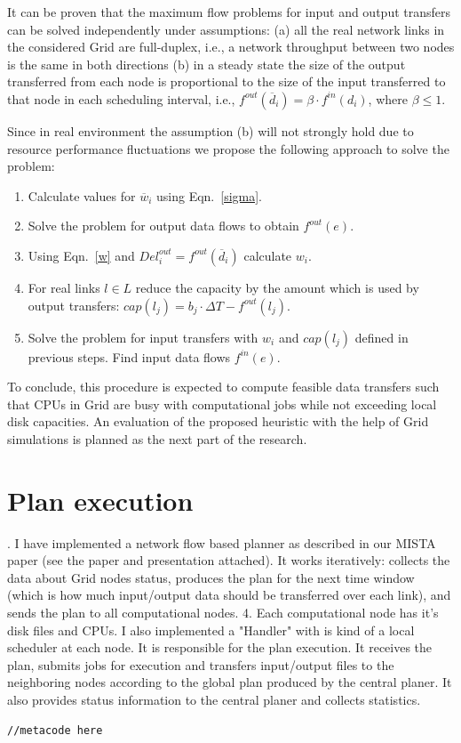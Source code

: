 \documentclass{svjour3}                     %
\begin{document}
It can be proven that the maximum flow problems for input and output transfers
can be solved independently under assumptions: (a) all the real network links
in the considered Grid are full-duplex, i.e., a network throughput between two
nodes is the same in both directions (b) in a steady state the size of the
output transferred from each node is proportional to the size of the input
transferred to that node in each scheduling interval, i.e.,
$f^{out}(\overline{d}_{i})= \beta \cdot f^{in}(d_{i})$, where $\beta \leq 1$.

Since in real environment the assumption (b) will not strongly hold due to
resource performance fluctuations we propose the following approach to
solve the problem:
%
\begin{enumerate}
\item Calculate values for $\overline{w}_{i}$ using Eqn.~\ref{sigma}.
\item Solve the problem for output data flows to obtain $f^{out}(e)$.
\item Using Eqn.~\ref{w} and $Del_{i}^{out} = f^{out}(\overline{d}_{i})$ calculate $w_{i}$.
\item For real links $l \in L$ reduce the capacity by the amount which is used by output transfers: $cap(l_{j}) = b_{j} \cdot \Delta T - f^{out}(l_{j})$.
\item Solve the problem for input transfers with $w_{i}$ and $cap(l_{j})$ defined in previous steps. Find input data flows $f^{in}(e)$.
\end{enumerate}
%
To conclude, this procedure is expected to compute feasible data transfers 
such that CPUs in Grid are busy with computational jobs while not exceeding 
local disk capacities. An evaluation of the proposed heuristic with the help of Grid simulations is planned as the next part of the research. 

\section{Plan execution}
\label{plan-execution}
. I have implemented a network flow based planner as described in our MISTA paper (see the paper and presentation attached). It works iteratively: collects the data about Grid nodes status, produces the plan for the next time window (which is how much input/output data should be transferred over each link), and sends the plan to all computational nodes.
4. Each computational node has it's disk files and CPUs. I also implemented a "Handler" with is kind of a local scheduler at each node. It is responsible for the plan execution. It receives the plan, submits jobs for execution and transfers input/output files to the neighboring nodes according to the global plan produced by the central planer. It also provides status information to the central planer and collects statistics.
\begin{lstlisting}
//metacode here
\end{lstlisting}
\end{document}
